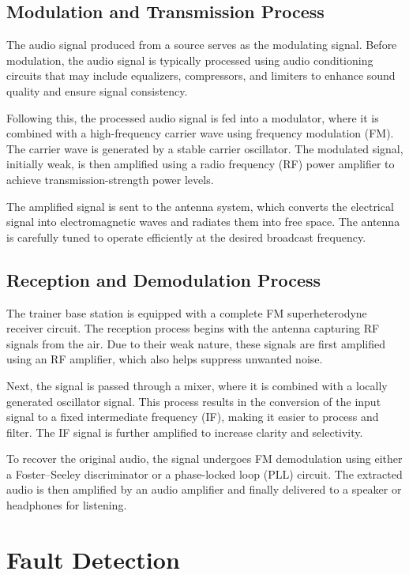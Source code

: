 \documentclass[a4paper,12pt]{article}
\begin{document}
	
	\subsection*{Modulation and Transmission Process}
	
	The audio signal produced from a source serves as the modulating signal. Before modulation, the audio signal is typically processed using audio conditioning circuits that may include equalizers, compressors, and limiters to enhance sound quality and ensure signal consistency.
	
	Following this, the processed audio signal is fed into a modulator, where it is combined with a high-frequency carrier wave using frequency modulation (FM). The carrier wave is generated by a stable carrier oscillator. The modulated signal, initially weak, is then amplified using a radio frequency (RF) power amplifier to achieve transmission-strength power levels.
	
	The amplified signal is sent to the antenna system, which converts the electrical signal into electromagnetic waves and radiates them into free space. The antenna is carefully tuned to operate efficiently at the desired broadcast frequency.
	
	\subsection*{Reception and Demodulation Process}
	
	The trainer base station is equipped with a complete FM superheterodyne receiver circuit. The reception process begins with the antenna capturing RF signals from the air. Due to their weak nature, these signals are first amplified using an RF amplifier, which also helps suppress unwanted noise.
	
	Next, the signal is passed through a mixer, where it is combined with a locally generated oscillator signal. This process results in the conversion of the input signal to a fixed intermediate frequency (IF), making it easier to process and filter. The IF signal is further amplified to increase clarity and selectivity.
	
	To recover the original audio, the signal undergoes FM demodulation using either a Foster–Seeley discriminator or a phase-locked loop (PLL) circuit. The extracted audio is then amplified by an audio amplifier and finally delivered to a speaker or headphones for listening.
	
	\section*{Fault Detection}
	
\end{document}
